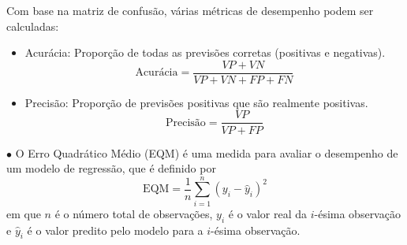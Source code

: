 \documentclass[a4paper,12pt,oneside,onecolumn]{Config/milktest}
\begin{document}
Com base na matriz de confusão, várias métricas de desempenho podem ser calculadas:
\begin{itemize}
\item Acurácia: Proporção de todas as previsões corretas (positivas e negativas).
   \[
   \text{Acurácia} = \frac{VP + VN}{VP + VN + FP + FN}
   \]

\item Precisão: Proporção de previsões positivas que são realmente positivas.
   \[
   \text{Precisão} = \frac{VP}{VP + FP}
   \]



\end{itemize}

\noindent $\bullet$ O Erro Quadrático Médio (EQM) é uma medida para avaliar o desempenho de um modelo de regressão, que é definido por
\[
\text{EQM} = \frac{1}{n} \sum_{i=1}^n (y_i - \hat{y}_i)^2
\] em que \( n \) é o número total de observações, \( y_i \) é o valor real da \( i \)-ésima observação e \( \hat{y}_i \) é o valor predito pelo modelo para a \( i \)-ésima observação.
\end{document}
